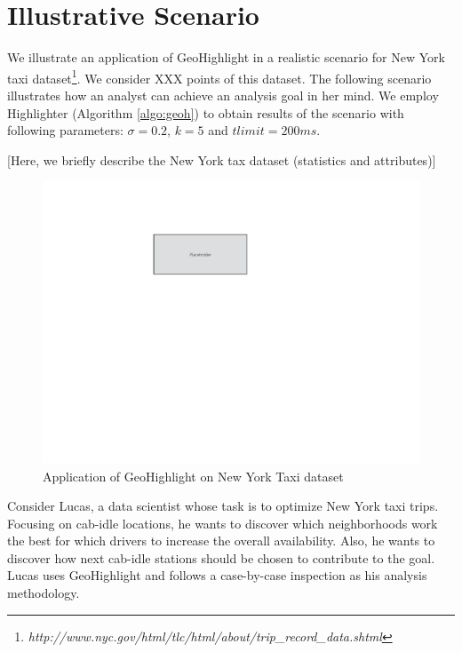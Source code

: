 \section{Illustrative Scenario}\label{sec:scenarios}
We illustrate an application of {\sc GeoHighlight} in a realistic scenario for New York taxi dataset\footnote{\it http://www.nyc.gov/html/tlc/html/about/trip_record_data.shtml}. We consider XXX points of this dataset. The following scenario illustrates how an analyst can achieve an analysis goal in her mind. We employ {\sc Highlighter} (Algorithm \ref{algo:geoh}) to obtain results of the scenario with following parameters: $\sigma = 0.2$, $k = 5$ and $tlimit = 200ms$. 

\vspace{5pt}
 [Here, we briefly describe the New York tax dataset (statistics and attributes)]

\begin{figure}
  \centering
  \includegraphics[width=\columnwidth]{figs/placeholder}
\caption{Application of {\sc GeoHighlight} on New York Taxi dataset}
\label{fig:app}
\end{figure}

\vspace{5pt}
Consider Lucas, a data scientist whose task is to optimize New York taxi trips. Focusing on cab-idle locations, he wants to discover which neighborhoods work the best for which drivers to increase the overall availability. Also, he wants to discover how next cab-idle stations should be chosen to contribute to the goal. Lucas uses {\sc GeoHighlight} and follows a case-by-case inspection as his analysis methodology.

